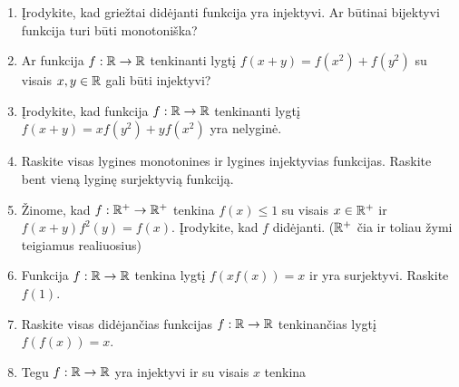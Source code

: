\begin{enumerate}
  \item Įrodykite, kad griežtai didėjanti funkcija yra injektyvi. Ar
    būtinai bijektyvi funkcija turi būti monotoniška?
  \item Ar funkcija $f:\mathbb R \to \mathbb R$ tenkinanti lygtį $f(x+y) = f(x^2) +
    f(y^2)$ su visais $x,y \in \mathbb R$ gali būti injektyvi?
  \item Įrodykite, kad funkcija $f:\mathbb R\to\mathbb R$ tenkinanti lygtį $f(x+y) =
    xf(y^2) + yf(x^2)$ yra nelyginė.
  \item Raskite visas lygines monotonines ir lygines injektyvias funkcijas.
    Raskite bent vieną lyginę surjektyvią funkciją.
  \item Žinome, kad $f:\mathbb R^+ \to \mathbb R^+$ tenkina $f(x)\leq 1$ su visais $x\in
    \mathbb R^+$ ir $f(x+y)f^2(y)=f(x)$. Įrodykite, kad $f$ didėjanti.  ($\mathbb R^+$
    čia ir toliau žymi teigiamus realiuosius)
  \item Funkcija $f:\mathbb R \to \mathbb R$ tenkina lygtį $f(xf(x)) = x$ ir yra
    surjektyvi. Raskite $f(1)$.
  \item Raskite visas didėjančias funkcijas $f:\mathbb R\to\mathbb R$ tenkinančias lygtį
    $f(f(x))=x$.
  \item Tegu $f:\mathbb R \to \mathbb R$ yra injektyvi ir su visais $x$ tenkina

\end{enumerate}

